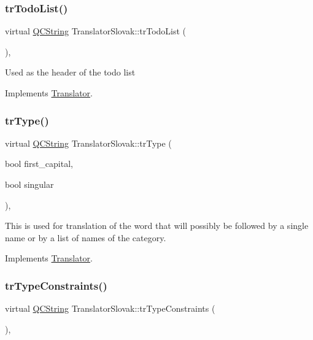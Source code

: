 \subsubsection{\texorpdfstring{trTodoList()}{trTodoList()}}
{\footnotesize\ttfamily virtual \mbox{\hyperlink{class_q_c_string}{Q\+C\+String}} Translator\+Slovak\+::tr\+Todo\+List (\begin{DoxyParamCaption}{ }\end{DoxyParamCaption})\hspace{0.3cm}{\ttfamily [inline]}, {\ttfamily [virtual]}}

Used as the header of the todo list 

Implements \mbox{\hyperlink{class_translator}{Translator}}.

\mbox{\label{class_translator_slovak_aecd4254284bb084bb8b35652c6156699}} 
\subsubsection{\texorpdfstring{trType()}{trType()}}
{\footnotesize\ttfamily virtual \mbox{\hyperlink{class_q_c_string}{Q\+C\+String}} Translator\+Slovak\+::tr\+Type (\begin{DoxyParamCaption}\item[{bool}]{first\+\_\+capital,  }\item[{bool}]{singular }\end{DoxyParamCaption})\hspace{0.3cm}{\ttfamily [inline]}, {\ttfamily [virtual]}}

This is used for translation of the word that will possibly be followed by a single name or by a list of names of the category. 

Implements \mbox{\hyperlink{class_translator}{Translator}}.

\mbox{\label{class_translator_slovak_a9ba605e00a6306f18fd453d0607735de}} 
\subsubsection{\texorpdfstring{trTypeConstraints()}{trTypeConstraints()}}
{\footnotesize\ttfamily virtual \mbox{\hyperlink{class_q_c_string}{Q\+C\+String}} Translator\+Slovak\+::tr\+Type\+Constraints (\begin{DoxyParamCaption}{ }\end{DoxyParamCaption})\hspace{0.3cm}{\ttfamily [inline]}, {\ttfamily [virtual]}}

